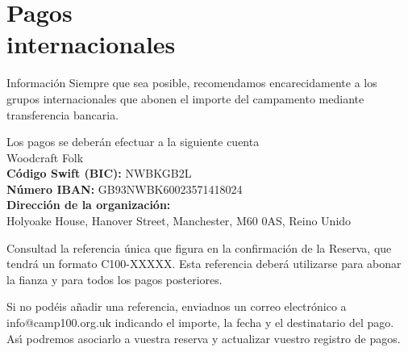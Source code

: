 \documentclass[a4paper, 11pt]{report}
\begin{document}
\chapter[Pagos internacionales]{Pagos\\ internacionales}

\begin{callout-green}{Informaci\'on}
Siempre que sea posible, recomendamos encarecidamente a los grupos internacionales que abonen el importe del campamento mediante transferencia bancaria.
\end{callout-green}

Los pagos se deber\'an efectuar a la siguiente cuenta\\
Woodcraft Folk\\
\textbf{C\'odigo Swift (BIC):} NWBKGB2L\\
\textbf{Número IBAN:} GB93NWBK60023571418024\\
\textbf{Direcci\'on de la organizaci\'on:} \\
Holyoake House, Hanover Street, Manchester, M60 0AS, Reino Unido

Consultad la referencia única que figura en la confirmaci\'on de la Reserva, que tendr\'a un formato C100-XXXXX. Esta referencia deber\'a utilizarse para abonar la fianza y para todos los pagos posteriores. 

Si no pod\'eis a\~nadir una referencia, enviadnos un correo electr\'onico a info@camp100.org.uk indicando el importe, la fecha y el destinatario del pago. As\'{\i} podremos asociarlo a vuestra reserva y actualizar vuestro registro de pagos. 


\makedocumentbackpage
\end{document}
